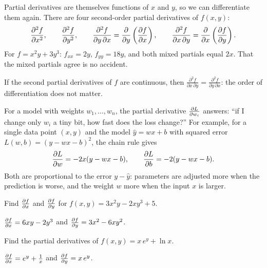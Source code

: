 Partial derivatives are themselves functions of $x$ and $y$, so we can
differentiate them again. There are four second-order partial derivatives of
$f(x,y)$:
\[
  \frac{\partial^2 f}{\partial x^2},\qquad
  \frac{\partial^2 f}{\partial y^2},\qquad
  \frac{\partial^2 f}{\partial y\,\partial x}
    = \frac{\partial}{\partial y}\left(\frac{\partial f}{\partial x}\right),\qquad
  \frac{\partial^2 f}{\partial x\,\partial y}
    = \frac{\partial}{\partial x}\left(\frac{\partial f}{\partial y}\right).
\]
For $f = x^2y + 3y^3$: $f_{xx} = 2y$, $f_{yy} = 18y$, and both mixed partials
equal $2x$. That the mixed partials agree is no accident.

\begin{theorem}\label{thm:clairaut}
If the second partial derivatives of $f$ are continuous, then
$\frac{\partial^2 f}{\partial x\,\partial y} = \frac{\partial^2 f}{\partial
y\,\partial x}$: the order of differentiation does not matter.
\end{theorem}

\begin{mlnote}
For a model with weights $w_1, \dots, w_n$, the partial derivative
$\frac{\partial L}{\partial w_i}$ answers: ``if I change only $w_i$ a tiny bit, how fast does the
loss change?'' For example, for a single data point $(x, y)$ and the model
$\hat y = wx + b$ with squared error $L(w, b) = (y - wx - b)^2$, the chain rule
gives
\[
  \frac{\partial L}{\partial w} = -2x(y - wx - b), \qquad \frac{\partial L}{\partial b} = -2(y - wx - b).
\]
Both are proportional to the error $y - \hat y$: parameters are adjusted more
when the prediction is worse, and the weight $w$ more when the input $x$ is
larger.
\end{mlnote}

\sectionexercises

\begin{exercise}
Find $\frac{\partial f}{\partial x}$ and $\frac{\partial f}{\partial y}$ for $f(x, y) = 3x^2y - 2xy^3 + 5$.
\end{exercise}
\begin{solution}
$\frac{\partial f}{\partial x} = 6xy - 2y^3$ and $\frac{\partial f}{\partial y} = 3x^2 - 6xy^2$.
\end{solution}

\begin{exercise}
Find the partial derivatives of $f(x, y) = x\,e^y + \ln x$.
\end{exercise}
\begin{solution}
$\frac{\partial f}{\partial x} = e^y + \tfrac1x$ and $\frac{\partial f}{\partial y} = x\,e^y$.
\end{solution}

